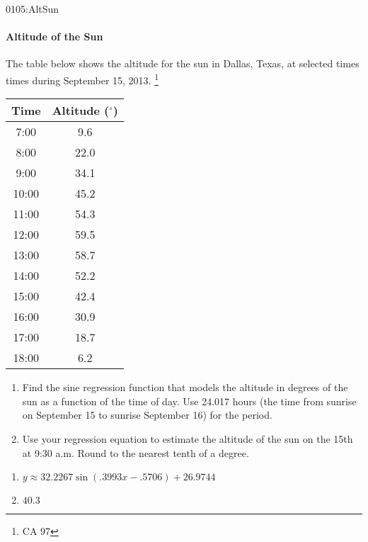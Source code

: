 \begin{defproblem}{0105:AltSun}
\begin{onlyproblem}
\paragraph{Altitude of the Sun}
The table below shows the altitude for the
sun in Dallas, Texas, at selected times times
during September 15, 2013.
\footnote{CA 97}
\begin{tabular}{c|c}
  \textbf{Time} & \textbf{Altitude ($^{\circ}$}) \\ \hline
  7:00 & 9.6 \\
  8:00 & 22.0 \\
  9:00 & 34.1 \\
  10:00 & 45.2\\
  11:00 & 54.3\\
  12:00 & 59.5\\
  13:00 & 58.7\\
  14:00 & 52.2\\
  15:00 & 42.4\\
  16:00 & 30.9\\
  17:00 & 18.7\\
  18:00 & 6.2\\
\end{tabular}
\begin{enumerate}
\item Find the sine regression function that models 
the altitude in degrees of the sun as a function of the
time of day.  Use 24.017 hours (the time from sunrise
on September 15 to sunrise September 16) for the period.
\item Use your regression equation to estimate the altitude
of the sun on the 15th at 9:30 a.m.  Round to the nearest
tenth of a degree.
\end{enumerate}
\end{onlyproblem}
\begin{onlysolution}
\begin{enumerate}
\item $y\approx32.2267\sin(.3993x-.5706)+26.9744$
\item $40.3$
\end{enumerate}
\end{onlysolution}
\end{defproblem}




